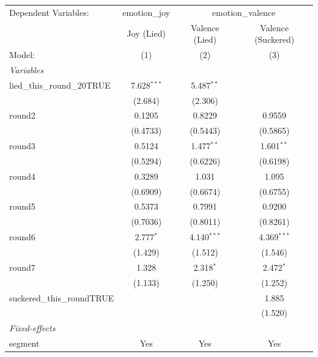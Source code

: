 
\begingroup
\centering
\begin{tabular}{lccc}
   \tabularnewline \midrule \midrule
   Dependent Variables: & emotion\_joy & \multicolumn{2}{c}{emotion\_valence}\\
                                & Joy (Lied)    & Valence (Lied) & Valence (Suckered) \\   
   Model:                       & (1)           & (2)            & (3)\\  
   \midrule
   \emph{Variables}\\
   lied\_this\_round\_20TRUE    & 7.628$^{***}$ & 5.487$^{**}$   &   \\   
                                & (2.684)       & (2.306)        &   \\   
   round2                       & 0.1205        & 0.8229         & 0.9559\\   
                                & (0.4733)      & (0.5443)       & (0.5865)\\   
   round3                       & 0.5124        & 1.477$^{**}$   & 1.601$^{**}$\\   
                                & (0.5294)      & (0.6226)       & (0.6198)\\   
   round4                       & 0.3289        & 1.031          & 1.095\\   
                                & (0.6909)      & (0.6674)       & (0.6755)\\   
   round5                       & 0.5373        & 0.7991         & 0.9200\\   
                                & (0.7036)      & (0.8011)       & (0.8261)\\   
   round6                       & 2.777$^{*}$   & 4.140$^{***}$  & 4.369$^{***}$\\   
                                & (1.429)       & (1.512)        & (1.546)\\   
   round7                       & 1.328         & 2.318$^{*}$    & 2.472$^{*}$\\   
                                & (1.133)       & (1.250)        & (1.252)\\   
   suckered\_this\_roundTRUE    &               &                & 1.885\\   
                                &               &                & (1.520)\\   
   \midrule
   \emph{Fixed-effects}\\
   segment                      & Yes           & Yes            & Yes\\  

\end{tabular}
